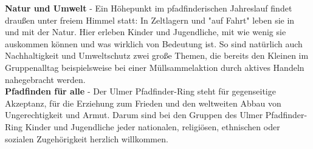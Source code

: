 \textbf{Natur und Umwelt} - Ein Höhepunkt im pfadfinderischen Jahreslauf findet draußen unter freiem Himmel 
statt: In Zeltlagern und "auf Fahrt" leben sie in und mit der Natur. Hier erleben Kinder und 
Jugendliche, mit wie wenig sie auskommen können und was wirklich von Bedeutung ist. So sind 
natürlich auch Nachhaltigkeit und Umweltschutz zwei große Themen, die bereits den Kleinen im 
Gruppenalltag beispielsweise bei einer Müllsammelaktion durch aktives Handeln nahegebracht werden.
\\

\textbf{Pfadfinden für alle} - Der Ulmer Pfadfinder-Ring steht für gegenseitige Akzeptanz, für die Erziehung 
zum Frieden und den weltweiten Abbau von Ungerechtigkeit und Armut. Darum sind bei den Gruppen des 
Ulmer Pfadfinder-Ring Kinder und Jugendliche jeder nationalen, religiösen, ethnischen oder sozialen 
Zugehörigkeit herzlich willkommen.
